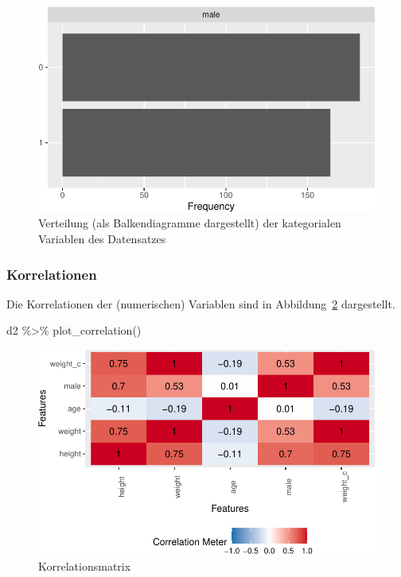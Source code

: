 \documentclass[
  a4paper,
  DIV=11]{scrreprt}
\newenvironment{Shaded}{\begin{snugshade}}{\end{snugshade}}
\newcommand{\FunctionTok}[1]{\textcolor[rgb]{0.28,0.35,0.67}{#1}}
\newcommand{\NormalTok}[1]{\textcolor[rgb]{0.00,0.23,0.31}{#1}}
\newcommand{\SpecialCharTok}[1]{\textcolor[rgb]{0.37,0.37,0.37}{#1}}
\theoremstyle{definition}
\theoremstyle{remark}
\begin{document}
\begin{figure}[H]

{\centering \includegraphics{./lineare-modelle_files/figure-pdf/fig-d2-bars-1.pdf}

}

\caption{\label{fig-d2-bars}Verteilung (als Balkendiagramme dargestellt)
der kategorialen Variablen des Datensatzes}

\end{figure}

\hypertarget{korrelationen}{%
\subsubsection{Korrelationen}\label{korrelationen}}

Die Korrelationen der (numerischen) Variablen sind in
Abbildung~\ref{fig-num-korrs} dargestellt.

\begin{Shaded}
\begin{Highlighting}[]
\NormalTok{d2 }\SpecialCharTok{\%\textgreater{}\%} \FunctionTok{plot\_correlation}\NormalTok{()}
\end{Highlighting}
\end{Shaded}

\begin{figure}[H]

{\centering \includegraphics{./lineare-modelle_files/figure-pdf/fig-num-korrs-1.pdf}

}

\caption{\label{fig-num-korrs}Korrelationsmatrix}

\end{figure}
\end{document}
